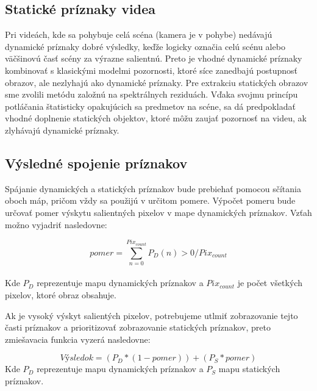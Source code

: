 \subsection{Statické príznaky videa}
Pri videách, kde sa pohybuje celá scéna (kamera je v pohybe) nedávajú dynamické príznaky dobré výsledky, keďže logicky označia celú scénu alebo väčšinovú časť scény za výrazne salientnú.
Preto je vhodné dynamické príznaky kombinovať s klasickými modelmi pozornosti, ktoré síce zanedbajú postupnosť obrazov, ale nezlyhajú ako dynamické príznaky.
Pre extrakciu statických obrazov sme zvolili metódu založnú na spektrálnych reziduách\cite{spectral-rezidual}.
Vďaka svojmu princípu potláčania štatisticky opakujúcich sa predmetov na scéne, sa dá predpokladať vhodné doplnenie statických objektov, ktoré môžu zaujať pozornosť na videu, ak zlyhávajú dynamické príznaky.

\subsection{Výsledné spojenie príznakov}
Spájanie dynamických a statických príznakov bude prebiehať pomocou sčítania oboch máp, pričom vždy sa použijú v určitom pomere.
Výpočet pomeru bude určovať pomer výskytu salientných pixelov v mape dynamických príznakov.
Vzťah možno vyjadriť nasledovne:

\begin{equation}
pomer = \sum_{n=0}^{Pix_{count}} P_D(n) > 0 / Pix_{count}
\end{equation}
\\
Kde \begin{math}P_D\end{math} reprezentuje mapu dynamických príznakov a \begin{math}Pix_{count}\end{math} je počet všetkých pixelov, ktoré obraz obsahuje.

Ak je vysoký výskyt salientých pixelov, potrebujeme utlmiť zobrazovanie tejto časti príznakov a prioritizovať zobrazovanie statických príznakov, preto zmiešavacia funkcia vyzerá nasledovne:

\begin{equation}
  Výsledok = (P_D * (1-pomer)) + (P_S * pomer)
\end{equation}
Kde \begin{math}P_D\end{math} reprezentuje mapu dynamických príznakov a \begin{math}P_S\end{math} mapu statických príznakov.

